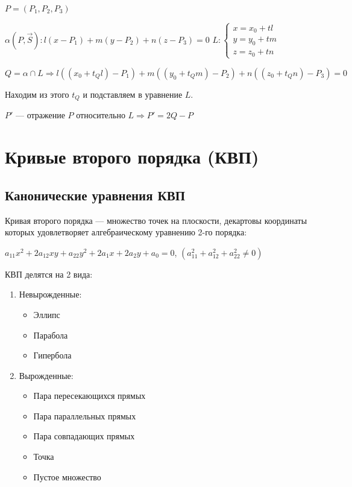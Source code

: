 \documentclass[twoside]{book}
\begin{document}
\(P = (P_1, P_2, P_3)\)

\(\alpha(P, \vec S): l(x - P_1) + m(y - P_2) + n(z - P_3) = 0\)
\(L:
\begin{cases}
    x = x_0 + t l \\
    y = y_0 + t m \\
    z = z_0 + t n
\end{cases}\)

\(Q = \alpha \cap L \Rightarrow l((x_0 + t_Q l) - P_1) + m((y_0 + t_Q m) - P_2) + n((z_0 + t_Q n) - P_3) = 0\)

Находим из этого \(t_Q\) и подставляем в уравнение \(L\).

\(P'\) --- отражение \(P\) относительно \(L \Rightarrow P' = 2Q - P\)


\section{Кривые второго порядка (КВП)}
\subsection{Канонические уравнения КВП}
Кривая второго порядка --- множество точек на плоскости, декартовы координаты которых удовлетворяет алгебраическому уравнению 2-го порядка:

\(a_{11} x^2 + 2 a_{12} xy + a_{22} y^2 + 2 a_1 x + 2 a_2 y + a_0 = 0\), \((a_{11}^2 + a_{12}^2 + a_{22}^2 \neq 0)\)

КВП делятся на 2 вида:
\begin{enumerate}
    \item Невырожденные:
          \begin{itemize}
              \item Эллипс
              \item Парабола
              \item Гипербола
          \end{itemize}
    \item Вырожденные:
          \begin{itemize}
              \item Пара пересекающихся прямых
              \item Пара параллельных прямых
              \item Пара совпадающих прямых
              \item Точка
              \item Пустое множество
          \end{itemize}
\end{enumerate}
\end{document}
